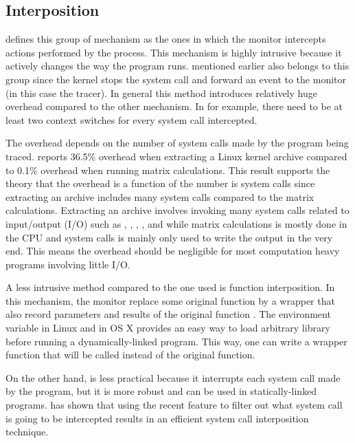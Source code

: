 \subsection{Interposition}

\citet{juvePracticalResourceMonitoring2015} defines this group of mechanism as the ones in which the monitor intercepts actions performed by the process.
This mechanism is highly intrusive because it actively changes the way the program runs.
 mentioned earlier also belongs to this group since the kernel stops the system call and forward an event to the monitor (in this case the tracer).
In general this method introduces relatively huge overhead compared to the other mechanism.
In  for example, there need to be at least two context switches for every system call intercepted.

The overhead depends on the number of system calls made by the program being traced.
\citet{kimPracticalEffectiveSandboxing2013} reports 36.5\% overhead when extracting a Linux kernel archive compared to 0.1\% overhead when running matrix calculations.
This result supports the theory that the overhead is a function of the number is system calls since extracting an archive includes many system calls compared to the matrix calculations.
Extracting an archive involves invoking many system calls related to input/output (I/O) such as , , , , and  while matrix calculations is mostly done in the CPU and system calls is mainly only used to write the output in the very end.
This means the overhead should be negligible for most computation heavy programs involving little I/O.


A less intrusive method compared to the one  used is function interposition.
In this mechanism, the monitor replace some original function by a wrapper that also record parameters and results of the original function \citep{juvePracticalResourceMonitoring2015}.
The environment variable  in Linux and  in OS X provides an easy way to load arbitrary library before running a dynamically-linked program.
This way, one can write a wrapper function that will be called instead of the original function.

On the other hand,  is less practical because it interrupts each system call made by the program, but it is more robust and can be used in statically-linked programs.
\citet{kimPracticalEffectiveSandboxing2013} has shown that using the recent  feature to filter out what system call is going to be intercepted results in an efficient system call interposition technique.


